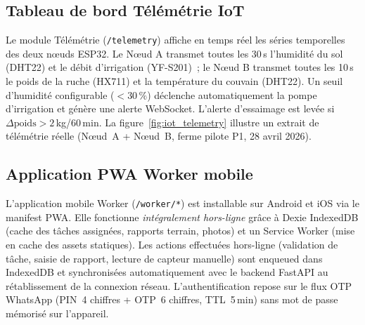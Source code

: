 \subsection{Tableau de bord Télémétrie IoT}

Le module Télémétrie (\texttt{/telemetry}) affiche en temps réel les séries
temporelles des deux nœuds ESP32. Le Nœud A transmet toutes les 30\,s
l'humidité du sol (DHT22) et le débit d'irrigation (YF-S201)~; le Nœud B
transmet toutes les 10\,s le poids de la ruche (HX711) et la température du
couvain (DHT22). Un seuil d'humidité configurable ($< 30\,\%$) déclenche
automatiquement la pompe d'irrigation et génère une alerte WebSocket.
L'alerte d'essaimage est levée si $\Delta\text{poids} > 2$\,kg/60\,min.
La figure~\ref{fig:iot_telemetry} illustre un extrait de télémétrie réelle
(Nœud~A + Nœud~B, ferme pilote P1, 28 avril 2026).

\subsection{Application PWA Worker mobile}

L'application mobile Worker (\texttt{/worker/*}) est installable sur Android
et iOS via le manifest PWA. Elle fonctionne \textit{intégralement hors-ligne}
grâce à Dexie IndexedDB (cache des tâches assignées, rapports terrain, photos)
et un Service Worker (mise en cache des assets statiques). Les actions
effectuées hors-ligne (validation de tâche, saisie de rapport, lecture de
capteur manuelle) sont enqueued dans IndexedDB et synchronisées automatiquement
avec le backend FastAPI au rétablissement de la connexion réseau.
L'authentification repose sur le flux OTP WhatsApp (PIN~4 chiffres + OTP~6 chiffres,
TTL~5\,min) sans mot de passe mémorisé sur l'appareil.

